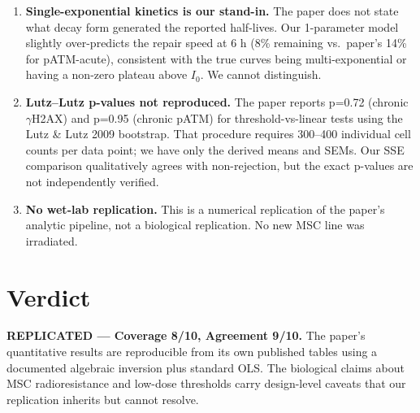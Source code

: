 \documentclass[11pt]{article}
\begin{document}
\begin{enumerate}[leftmargin=1.5em]
\item \textbf{Single-exponential kinetics is our stand-in.} The paper does not state
what decay form generated the reported half-lives. Our 1-parameter model slightly
over-predicts the repair speed at 6 h (8\% remaining vs.\ paper's 14\% for pATM-acute),
consistent with the true curves being multi-exponential or having a non-zero plateau
above $I_0$. We cannot distinguish.

\item \textbf{Lutz--Lutz p-values not reproduced.} The paper reports p=0.72 (chronic
$\gamma$H2AX) and p=0.95 (chronic pATM) for threshold-vs-linear tests using the
Lutz \& Lutz 2009 bootstrap. That procedure requires 300--400 individual cell counts
per data point; we have only the derived means and SEMs. Our SSE comparison qualitatively
agrees with non-rejection, but the exact p-values are not independently verified.

\item \textbf{No wet-lab replication.} This is a numerical replication of the paper's
analytic pipeline, not a biological replication. No new MSC line was irradiated.
\end{enumerate}

\section{Verdict}

\textbf{REPLICATED --- Coverage 8/10, Agreement 9/10.}
The paper's quantitative results are reproducible from its own published tables using
a documented algebraic inversion plus standard OLS. The biological claims about MSC
radioresistance and low-dose thresholds carry design-level caveats that our replication
inherits but cannot resolve.


\end{document}

